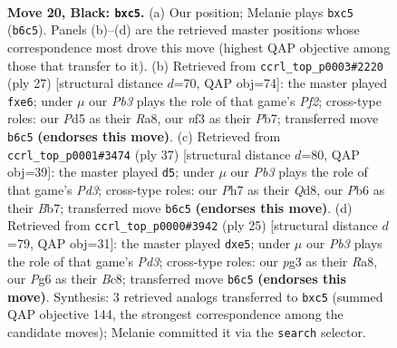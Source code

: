 \documentclass[11pt]{article}
\begin{document}
\begin{figure}[p]
\label{fig:thought-m37}
\end{figure}

\clearpage

\begin{figure}[p]\centering
\begin{subfigure}{0.46\textwidth}\centering
\resizebox{\linewidth}{!}{%
\newchessgame
\chessboard[
  setfen={1rbq1r1k/p1n1b2p/1p4p1/2Pp1p1n/P4P2/1P3NP1/Q2NP1BP/R1B1R1K1 b - - 0 20},
  showmover=false,
  pgfstyle=straightmove, color=movearrow, markmove={b6-c5}
]}
\caption{}
\end{subfigure}\hfill
\begin{subfigure}{0.46\textwidth}\centering
\resizebox{\linewidth}{!}{%
\newchessgame
\chessboard[
  setfen={r1bq1rk1/pp3p1p/3pPbp1/2p5/2PnPP2/2N2N2/PP1QB1PP/R4R1K b - - 0 14},
  showmover=false,
  pgfstyle=straightmove, color=movearrow, markmove={f7-e6}
]}
\caption{}
\end{subfigure}
\\[4pt]
\begin{subfigure}{0.46\textwidth}\centering
\resizebox{\linewidth}{!}{%
\newchessgame
\chessboard[
  setfen={1r1qr1k1/1bpnbpp1/p2pp2p/8/2PPNP1P/6P1/P1QNBP2/3RR1K1 b - - 2 19},
  showmover=false,
  pgfstyle=straightmove, color=movearrow, markmove={d6-d5}
]}
\caption{}
\end{subfigure}\hfill
\begin{subfigure}{0.46\textwidth}\centering
\resizebox{\linewidth}{!}{%
\newchessgame
\chessboard[
  setfen={r1bqr1k1/2p2pp1/1bpp1n1p/p3P3/4P3/2P2N1P/PPQN1PP1/R1B1R1K1 b - - 0 13},
  showmover=false,
  pgfstyle=straightmove, color=movearrow, markmove={d6-e5}
]}
\caption{}
\end{subfigure}
\caption{\textbf{Move 20, Black: \texttt{bxc5}.} (a) Our position; Melanie plays \texttt{bxc5} (\texttt{b6c5}). Panels (b)--(d) are the retrieved master positions whose correspondence most drove this move (highest QAP objective among those that transfer to it). (b) Retrieved from \texttt{ccrl\_top\_p0003\#2220} (ply 27) [structural distance $d$=70, QAP obj=74]: the master played \texttt{fxe6}; under $\mu$ our \emph{Pb3} plays the role of that game's \emph{Pf2}; cross-type roles: our \emph{P}d5 as their \emph{R}a8, our \emph{n}f3 as their \emph{P}b7; transferred move \texttt{b6c5} \textbf{(endorses this move)}. (c) Retrieved from \texttt{ccrl\_top\_p0001\#3474} (ply 37) [structural distance $d$=80, QAP obj=39]: the master played \texttt{d5}; under $\mu$ our \emph{Pb3} plays the role of that game's \emph{Pd3}; cross-type roles: our \emph{P}h7 as their \emph{Q}d8, our \emph{P}b6 as their \emph{B}b7; transferred move \texttt{b6c5} \textbf{(endorses this move)}. (d) Retrieved from \texttt{ccrl\_top\_p0000\#3942} (ply 25) [structural distance $d$=79, QAP obj=31]: the master played \texttt{dxe5}; under $\mu$ our \emph{Pb3} plays the role of that game's \emph{Pd3}; cross-type roles: our \emph{p}g3 as their \emph{R}a8, our \emph{P}g6 as their \emph{B}c8; transferred move \texttt{b6c5} \textbf{(endorses this move)}. Synthesis: 3 retrieved analogs transferred to \texttt{bxc5} (summed QAP objective 144, the strongest correspondence among the candidate moves); Melanie committed it via the \texttt{search} selector.}

\end{figure}
\end{document}
